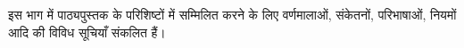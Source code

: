 \documentclass[../../include/open-logic-part]{subfiles}
\begin{document}

\begin{editorial}
  इस भाग में पाठ्यपुस्तक के परिशिष्टों में सम्मिलित करने के लिए वर्णमालाओं,
  संकेतनों, परिभाषाओं, नियमों आदि की विविध सूचियाँ संकलित हैं।
\end{editorial}



\OLEndPartHook
\end{document}
